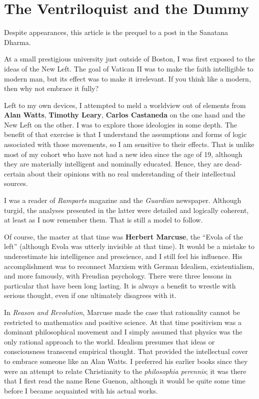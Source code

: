 \section{The Ventriloquist and the Dummy}

Despite appearances, this article is the prequel to a post in the Sanatana Dharma.

At a small prestigious university just outside of Boston, I was first exposed to the ideas of the New Left. The goal of Vatican II was to make the faith intelligible to modern man, but its effect was to make it irrelevant. If you think like a modern, then why not embrace it fully?

Left to my own devices, I attempted to meld a worldview out of elements from \textbf{Alan Watts}, \textbf{Timothy Leary}, \textbf{Carlos Castaneda} on the one hand and the New Left on the other. I was to explore those ideologies in some depth. The benefit of that exercise is that I understand the assumptions and forms of logic associated with those movements, so I am sensitive to their effects. That is unlike most of my cohort who have not had a new idea since the age of 19, although they are materially intelligent and nominally educated. Hence, they are dead-certain about their opinions with no real understanding of their intellectual sources.

I was a reader of \emph{Ramparts} magazine and the \emph{Guardian} newspaper. Although turgid, the analyses presented in the latter were detailed and logically coherent, at least as I now remember them. That is still a model to follow.

Of course, the master at that time was \textbf{Herbert Marcuse}, the ``Evola of the left'' (although Evola was utterly invisible at that time). It would be a mistake to underestimate his intelligence and prescience, and I still feel his influence. His accomplishment was to reconnect Marxism with German Idealism, existentialism, and more famously, with Freudian psychology. There were three lessons in particular that have been long lasting. It is always a benefit to wrestle with serious thought, even if one ultimately disagrees with it.

In \emph{Reason and Revolution}, Marcuse made the case that rationality cannot be restricted to mathematics and positive science. At that time positivism was a dominant philosophical movement and I simply assumed that physics was the only rational approach to the world. Idealism presumes that ideas or consciousness transcend empirical thought. That provided the intellectual cover to embrace someone like an Alan Watts. I preferred his earlier books since they were an attempt to relate Christianity to the \emph{philosophia perennis}; it was there that I first read the name Rene Guenon, although it would be quite some time before I became acquainted with his actual works.

